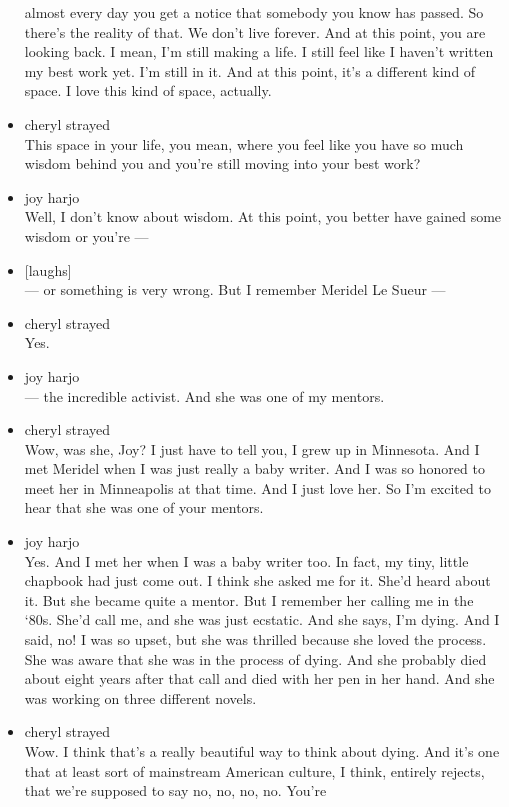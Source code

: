 \begin{itemize}
  almost every day you get a notice that somebody you know has passed.
  So there's the reality of that. We don't live forever. And at this
  point, you are looking back. I mean, I'm still making a life. I still
  feel like I haven't written my best work yet. I'm still in it. And at
  this point, it's a different kind of space. I love this kind of space,
  actually.
\item
  cheryl strayed\\
  This space in your life, you mean, where you feel like you have so
  much wisdom behind you and you're still moving into your best work?
\item
  joy harjo\\
  Well, I don't know about wisdom. At this point, you better have gained
  some wisdom or you're ---
\item
  {[}laughs{]}\\
  --- or something is very wrong. But I remember Meridel Le Sueur ---
\item
  cheryl strayed\\
  Yes.
\item
  joy harjo\\
  --- the incredible activist. And she was one of my mentors.
\item
  cheryl strayed\\
  Wow, was she, Joy? I just have to tell you, I grew up in Minnesota.
  And I met Meridel when I was just really a baby writer. And I was so
  honored to meet her in Minneapolis at that time. And I just love her.
  So I'm excited to hear that she was one of your mentors.
\item
  joy harjo\\
  Yes. And I met her when I was a baby writer too. In fact, my tiny,
  little chapbook had just come out. I think she asked me for it. She'd
  heard about it. But she became quite a mentor. But I remember her
  calling me in the `80s. She'd call me, and she was just ecstatic. And
  she says, I'm dying. And I said, no! I was so upset, but she was
  thrilled because she loved the process. She was aware that she was in
  the process of dying. And she probably died about eight years after
  that call and died with her pen in her hand. And she was working on
  three different novels.
\item
  cheryl strayed\\
  Wow. I think that's a really beautiful way to think about dying. And
  it's one that at least sort of mainstream American culture, I think,
  entirely rejects, that we're supposed to say no, no, no, no. You're

\end{itemize}
